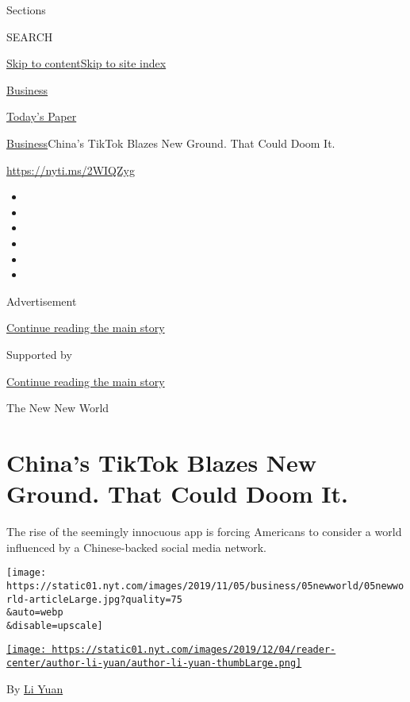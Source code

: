 Sections

SEARCH

\protect\hyperlink{site-content}{Skip to
content}\protect\hyperlink{site-index}{Skip to site index}

\href{https://www.nytimes.com/section/business}{Business}

\href{https://myaccount.nytimes.com/auth/login?response_type=cookie\&client_id=vi}{}

\href{https://www.nytimes.com/section/todayspaper}{Today's Paper}

\href{/section/business}{Business}\textbar{}China's TikTok Blazes New
Ground. That Could Doom It.

\url{https://nyti.ms/2WIQZyg}

\begin{itemize}
\item
\item
\item
\item
\item
\item
\end{itemize}

Advertisement

\protect\hyperlink{after-top}{Continue reading the main story}

Supported by

\protect\hyperlink{after-sponsor}{Continue reading the main story}

The New New World

\hypertarget{chinas-tiktok-blazes-new-ground-that-could-doom-it}{%
\section{China's TikTok Blazes New Ground. That Could Doom
It.}\label{chinas-tiktok-blazes-new-ground-that-could-doom-it}}

The rise of the seemingly innocuous app is forcing Americans to consider
a world influenced by a Chinese-backed social media network.

\texttt{[image: https://static01.nyt.com/images/2019/11/05/business/05newworld/05newworld-articleLarge.jpg?quality=75\\\&auto=webp\\\&disable=upscale]}

\href{https://www.nytimes.com/by/li-yuan}{\texttt{[image: https://static01.nyt.com/images/2019/12/04/reader-center/author-li-yuan/author-li-yuan-thumbLarge.png]}}

By \href{https://www.nytimes.com/by/li-yuan}{Li Yuan}

